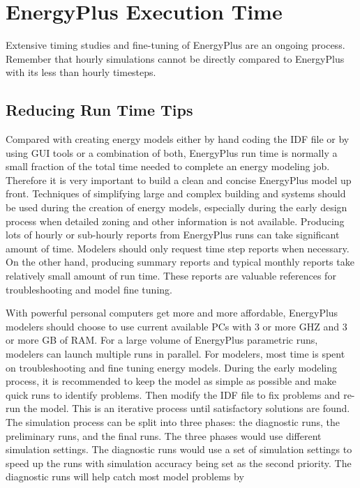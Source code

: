 \section{EnergyPlus Execution Time}\label{energyplus-execution-time}

Extensive timing studies and fine-tuning of EnergyPlus are an ongoing process. Remember that hourly simulations cannot be directly compared to EnergyPlus with its less than hourly timesteps.

\subsection{Reducing Run Time Tips}\label{reducing-run-time-tips}

Compared with creating energy models either by hand coding the IDF file or by using GUI tools or a combination of both, EnergyPlus run time is normally a small fraction of the total time needed to complete an energy modeling job. Therefore it is very important to build a clean and concise EnergyPlus model up front. Techniques of simplifying large and complex building and systems should be used during the creation of energy models, especially during the early design process when detailed zoning and other information is not available. Producing lots of hourly or sub-hourly reports from EnergyPlus runs can take significant amount of time. Modelers should only request time step reports when necessary. On the other hand, producing summary reports and typical monthly reports take relatively small amount of run time. These reports are valuable references for troubleshooting and model fine tuning.

With powerful personal computers get more and more affordable, EnergyPlus modelers should choose to use current available PCs with 3 or more GHZ and 3 or more GB of RAM. For a large volume of EnergyPlus parametric runs, modelers can launch multiple runs in parallel. For modelers, most time is spent on troubleshooting and fine tuning energy models. During the early modeling process, it is recommended to keep the model as simple as possible and make quick runs to identify problems. Then modify the IDF file to fix problems and re-run the model. This is an iterative process until satisfactory solutions are found. The simulation process can be split into three phases: the diagnostic runs, the preliminary runs, and the final runs. The three phases would use different simulation settings. The diagnostic runs would use a set of simulation settings to speed up the runs with simulation accuracy being set as the second priority. The diagnostic runs will help catch most model problems by

